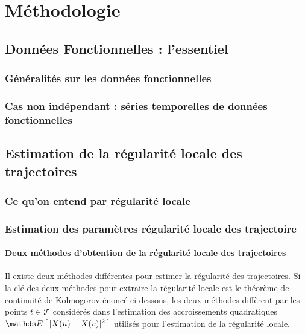 \chapter{Méthodologie}
\minitoc%

\section{Données Fonctionnelles : l'essentiel}
    \subsection{Généralités sur les données fonctionnelles}

    

    \subsection{Cas non indépendant : séries temporelles de données fonctionnelles}
        
    

\section{Estimation de la régularité locale des trajectoires}

\subsection{Ce qu'on entend par régularité locale}




\subsection{Estimation des paramètres régularité locale des trajectoire}

\subsubsection{Deux méthodes d'obtention de la régularité locale des trajectoires}

Il existe deux méthodes différentes pour estimer la régularité des trajectoires. Si la clé des deux méthodes pour extraire la régularité locale est le théorème de continuité de Kolmogorov énoncé ci-dessous, les deux méthodes diffèrent par les points $t \in \mathcal T$ considérés dans l'estimation des accroissements quadratiques $\esperance{ \vert X(u) - X(v) \vert^2 }$ utilisés pour l'estimation de la régularité locale. 

